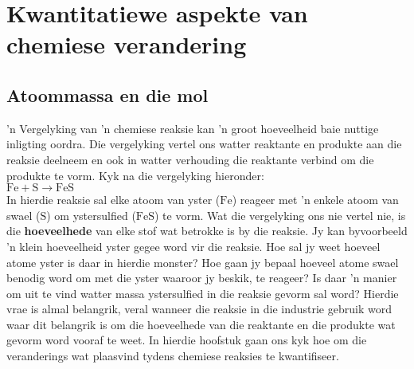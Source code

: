          \chapter{Kwantitatiewe aspekte van chemiese verandering }\label{chap:quanchem}
    \setcounter{figure}{1}
    \setcounter{subfigure}{1}
    \label{0044f0dab6cfd2ca2bac282dc4009886}
         \section{Atoommassa en die mol}
    \nopagebreak

 'n Vergelyking van 'n chemiese reaksie kan  'n groot hoeveelheid baie nuttige inligting oordra. Die vergelyking vertel ons watter reaktante en produkte aan die reaksie deelneem en ook in watter verhouding die reaktante verbind om die produkte te vorm. Kyk na die vergelyking hieronder:\\

        $\text{Fe}+\text{S}\to \text{FeS}$\\
In hierdie reaksie sal elke atoom van yster ($\text{Fe}$) reageer met 'n enkele atoom van swael ($\text{S}$) om ystersulfied ($\text{FeS}$) te vorm. Wat die vergelyking ons nie vertel nie, is die \textbf{hoeveelhede} van elke stof wat betrokke is by die reaksie. Jy kan byvoorbeeld 'n klein hoeveelheid yster gegee word vir die reaksie. Hoe sal jy weet hoeveel atome yster is daar in hierdie monster? Hoe gaan jy bepaal hoeveel atome swael benodig word om met die yster waaroor jy beskik, te reageer? Is daar 'n manier om uit te vind watter massa ystersulfied in die reaksie gevorm sal word? Hierdie vrae is almal belangrik, veral wanneer die reaksie in die industrie gebruik word waar dit belangrik is om die hoeveelhede van die reaktante en die produkte wat gevorm word vooraf te weet. In hierdie  hoofstuk gaan ons kyk hoe om die veranderings wat plaasvind tydens chemiese reaksies te kwantifiseer.
